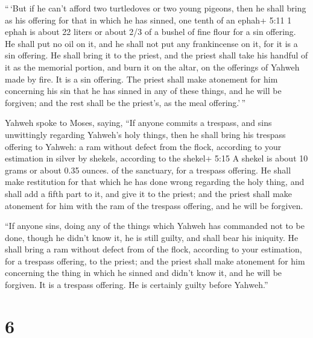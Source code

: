  ``\,`But if he can't afford two turtledoves or two young
pigeons, then he shall bring as his offering for that in which he has
sinned, one tenth of an ephah+ 5:11 1 ephah is about 22 liters or about
2/3 of a bushel of fine flour for a sin offering. He shall put no oil on
it, and he shall not put any frankincense on it, for it is a sin
offering.  He shall bring it to the priest, and the priest
shall take his handful of it as the memorial portion, and burn it on the
altar, on the offerings of Yahweh made by fire. It is a sin offering.
 The priest shall make atonement for him concerning his sin
that he has sinned in any of these things, and he will be forgiven; and
the rest shall be the priest's, as the meal offering.'\,''

 Yahweh spoke to Moses, saying,  ``If anyone
commits a trespass, and sins unwittingly regarding Yahweh's holy things,
then he shall bring his trespass offering to Yahweh: a ram without
defect from the flock, according to your estimation in silver by
shekels, according to the shekel+ 5:15 A shekel is about 10 grams or
about 0.35 ounces. of the sanctuary, for a trespass offering.
 He shall make restitution for that which he has done wrong
regarding the holy thing, and shall add a fifth part to it, and give it
to the priest; and the priest shall make atonement for him with the ram
of the trespass offering, and he will be forgiven.

 ``If anyone sins, doing any of the things which Yahweh has
commanded not to be done, though he didn't know it, he is still guilty,
and shall bear his iniquity.  He shall bring a ram without
defect from of the flock, according to your estimation, for a trespass
offering, to the priest; and the priest shall make atonement for him
concerning the thing in which he sinned and didn't know it, and he will
be forgiven.  It is a trespass offering. He is certainly
guilty before Yahweh.''

\hypertarget{section-5}{%
\section{6}\label{section-5}}

